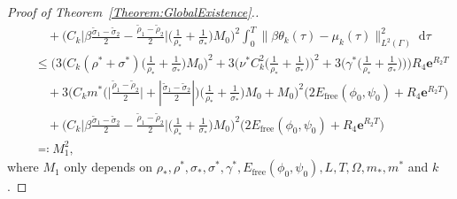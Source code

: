 \documentclass[10pt,reqno]{amsart}
\theoremstyle{remark}
\numberwithin{equation}{section}
\newcommand{\abs}[1]{| #1 |}
\newcommand{\Bigabs}[1]{\Big| #1 \Big|}
\newcommand{\norm}[1]{\| #1 \|}
\newcommand{\dtau}{\;\mathrm d\tau}
\newcommand{\e}{\mathbf{e}}
\newcommand{\Om}{\Omega}
\newcommand{\Ga}{\Gamma}
\begin{document}
\begin{proof}[Proof of Theorem~\ref{Theorem:GlobalExistence}.]
\begin{align}
    &\qquad + \Big(C_k\Bigabs{\beta\frac{\tilde\sigma_1 - \tilde\sigma_2}{2} - \frac{\tilde\rho_1 - \tilde\rho_2}{2}}\Big(\frac{1}{\rho_\ast} + \frac{1}{\sigma_\ast}\Big)M_0\Big)^2\int_0^T\norm{\beta\theta_k(\tau) - \mu_k(\tau)}_{L^2(\Ga)}^2\dtau \\
    &\quad\leq \Bigg(3\Big(C_k(\rho^\ast + \sigma^\ast)\Big(\frac{1}{\rho_\ast} + \frac{1}{\sigma_\ast}\Big)M_0\Big)^2 +  3\Big(\nu^\ast C_k^2\Big(\frac{1}{\rho_\ast} + \frac{1}{\sigma_\ast}\Big)\Big)^2 + 3\Big(\gamma^\ast\Big(\frac{1}{\rho_\ast} + \frac{1}{\sigma_\ast}\Big)\Big)\Bigg)R_4\e^{R_2T} \nonumber \\
    &\qquad + 3\Big(C_km^\ast\bigg(\Bigabs{\frac{\tilde\rho_1 - \tilde\rho_2}{2}} + \abs{\frac{\tilde\sigma_1 - \tilde\sigma_2}{2}}\bigg)\Big(\frac{1}{\rho_\ast} + \frac{1}{\sigma_\ast}\Big)M_0 + M_0\Big)^2\Big(2E_{\mathrm{free}}(\phi_0,\psi_0) + R_4\e^{R_2T}\Big) \nonumber \\
    &\qquad + \Big(C_k\Bigabs{\beta\frac{\tilde\sigma_1 - \tilde\sigma_2}{2} - \frac{\tilde\rho_1 - \tilde\rho_2}{2}}\Big(\frac{1}{\rho_\ast} + \frac{1}{\sigma_\ast}\Big)M_0\Big)^2\Big(2E_{\mathrm{free}}(\phi_0,\psi_0) + R_4\e^{R_2T}\Big) \nonumber \\
    &\quad\eqqcolon M_1^2, \nonumber
\end{align}
where $M_1$ only depends on $\rho_\ast,\rho^\ast,\sigma_\ast,\sigma^\ast,\gamma^\ast, E_{\mathrm{free}}(\phi_0,\psi_0), L,T,\Om, m_\ast, m^\ast$ and $k$.


\end{proof}
\end{document}
